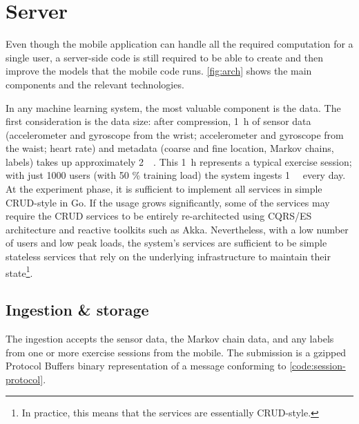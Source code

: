 \section{Server}\label{sec:server}
Even though the mobile application can handle all the required computation for a single user, a server-side code is still required to be able to create and then improve the models that the mobile code runs. \autoref{fig:arch} shows the main components and the relevant technologies.


In any machine learning system, the most valuable component is the data. The first consideration is the data size: after compression, \SI{1}{\hour} of sensor data (accelerometer and gyroscope from the wrist; accelerometer and gyroscope from the waist; heart rate) and metadata (coarse and fine location, Markov chains, labels) takes up approximately \SI{2}{\mebi\byte}. This \SI{1}{\hour} represents a typical exercise session; with just 1000 users (with 50 \% training load) the system ingests \SI{1}{\gibi\byte} every day. At the experiment phase, it is sufficient to implement all services in simple CRUD-style in Go. If the usage grows significantly, some of the services may require the CRUD services to be entirely re-architected using CQRS/ES architecture and reactive toolkits such as Akka\cite{akka}. Nevertheless, with a low number of users and low peak loads, the system's services are sufficient to be simple stateless services that rely on the underlying infrastructure to maintain their state\footnote{In practice, this means that the services are essentially CRUD-style.}.  

\subsection{Ingestion \& storage}
The ingestion accepts the sensor data, the Markov chain data, and any labels from one or more exercise sessions from the mobile. The submission is a gzipped Protocol Buffers\cite{protobuf} binary representation of a message conforming to \autoref{code:session-protocol}.

